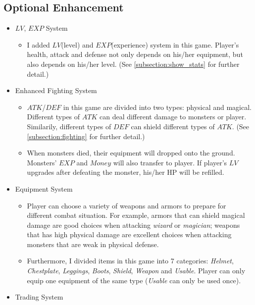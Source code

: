 \documentclass{article}
\begin{document}
    
    \subsection{Optional Enhancement}
    \begin{itemize}
        \item $LV$, $EXP$ System
        \begin{itemize}
            \item I added $LV$(level) and $EXP$(experience) system in this game. Player's health, attack and defense not only depends on his/her equipment, but also depends on his/her level. (See \ref{subsection:show_stats} for further detail.)
        \end{itemize}
        \item Enhanced Fighting System
        \begin{itemize}
            \item $ATK$/$DEF$ in this game are divided into two types: physical and magical. Different types of $ATK$ can deal different damage to monsters or player. Similarily, different types of $DEF$ can shield different types of $ATK$. (See \ref{subsection:fighting} for further detail.)
            \item When monsters died, their equipment will dropped onto the ground. Monsters' $EXP$ and $Money$ will also transfer to player. If player's $LV$ upgrades after defeating the monster, his/her HP will be refilled.
        \end{itemize}
        \item Equipment System
        \begin{itemize}
            \item Player can choose a variety of weapons and armors to prepare for different combat situation. For example, armors that can shield magical damage are good choices when attacking \textit{wizard} or \textit{magician}; weapons that has high physical damage are excellent choices when attacking monsters that are weak in physical defense.
            \item Furthermore, I divided items in this game into 7 categories:  \textit{Helmet}, \textit{Chestplate}, \textit{Leggings}, \textit{Boots}, \textit{Shield}, \textit{Weapon} and \textit{Usable}. Player can only equip one equipment of the same type (\textit{Usable} can only be used once).
        \end{itemize}
        \item Trading System
        \begin{itemize}

\end{itemize}
\end{itemize}
\end{document}
